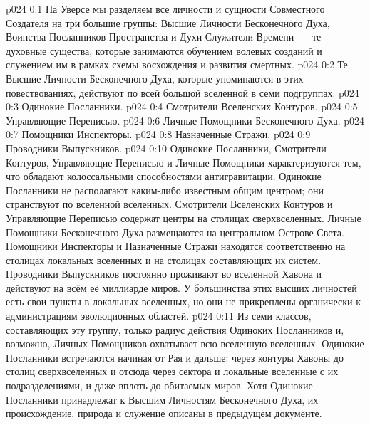 \author{Божественный Советник}
\vs p024 0:1 На Уверсе мы разделяем все личности и сущности Совместного Создателя на три большие группы: Высшие Личности Бесконечного Духа, Воинства Посланников Пространства и Духи Служители Времени~--- те духовные существа, которые занимаются обучением волевых созданий и служением им в рамках схемы восхождения и развития смертных.
\vs p024 0:2 \pc Те Высшие Личности Бесконечного Духа, которые упоминаются в этих повествованиях, действуют по всей большой вселенной в семи подгруппах:
\vs p024 0:3 Одинокие Посланники.
\vs p024 0:4 Смотрители Вселенских Контуров.
\vs p024 0:5 Управляющие Переписью.
\vs p024 0:6 Личные Помощники Бесконечного Духа.
\vs p024 0:7 Помощники Инспекторы.
\vs p024 0:8 Назначенные Стражи.
\vs p024 0:9 Проводники Выпускников.
\vs p024 0:10 \pc Одинокие Посланники, Смотрители Контуров, Управляющие Переписью и Личные Помощники характеризуются тем, что обладают колоссальными способностями антигравитации. Одинокие Посланники не располагают каким\hyp{}либо известным общим центром; они странствуют по вселенной вселенных. Смотрители Вселенских Контуров и Управляющие Переписью содержат центры на столицах сверхвселенных. Личные Помощники Бесконечного Духа размещаются на центральном Острове Света. Помощники Инспекторы и Назначенные Стражи находятся соответственно на столицах локальных вселенных и на столицах составляющих их систем. Проводники Выпускников постоянно проживают во вселенной Хавона и действуют на всём её миллиарде миров. У большинства этих высших личностей есть свои пункты в локальных вселенных, но они не прикреплены органически к администрациям эволюционных областей.
\vs p024 0:11 Из семи классов, составляющих эту группу, только радиус действия Одиноких Посланников и, возможно, Личных Помощников охватывает всю вселенную вселенных. Одинокие Посланники встречаются начиная от Рая и дальше: через контуры Хавоны до столиц сверхвселенных и отсюда через сектора и локальные вселенные с их подразделениями, и даже вплоть до обитаемых миров. Хотя Одинокие Посланники принадлежат к Высшим Личностям Бесконечного Духа, их происхождение, природа и служение описаны в предыдущем документе.
